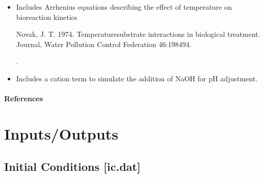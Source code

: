 \documentclass[a4paper,10pt,english]{sphinxmanual}
\begin{document}
\begin{itemize}
\item {} 
\sphinxAtStartPar
Includes Arrhenius equations describing the effect of temperature on bioreaction kinetics %
\begin{footnote}[5]\sphinxAtStartFootnote
Novak, J. T. 1974. Temperature\sphinxhyphen{}substrate interactions in biological treatment. Journal, Water Pollution Control Federation 46:1984\textendash{}94.
%
\end{footnote}.

\item {} 
\sphinxAtStartPar
Includes a cation term to simulate the addition of NaOH for pH adjustment.

\end{itemize}
\subsubsection*{References}


\chapter{Inputs/Outputs}
\label{\detokenize{inouts:inputs-outputs}}\label{\detokenize{inouts:inouts-label}}\label{\detokenize{inouts::doc}}

\section{Initial Conditions {[}ic.dat{]}}
\label{\detokenize{inouts:initial-conditions-ic-dat}}
\end{document}
